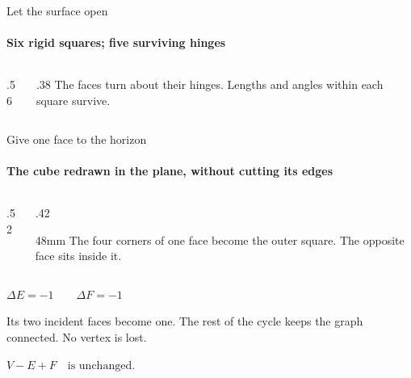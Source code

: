 \documentclass[aspectratio=169,11pt]{beamer}
\begin{document}
\begin{frame}{Let the surface open}
  \framesubtitle{Six rigid squares; five surviving hinges}
  \begin{columns}[c,onlytextwidth]
    \begin{column}{.56\textwidth}
      \centering
    \end{column}
    \begin{column}{.38\textwidth}
      The faces turn about their hinges. Lengths and angles within each
      square survive.\par\medskip
    \end{column}
  \end{columns}
\end{frame}

\begin{frame}{Give one face to the horizon}
  \framesubtitle{The cube redrawn in the plane, without cutting its edges}
  \begin{columns}[c,onlytextwidth]
    \begin{column}{.52\textwidth}
      \centering{}
    \end{column}
    \begin{column}{.42\textwidth}
      \begin{overlayarea}{\linewidth}{48mm}
        The four corners of one face become the outer square. The
        opposite face sits inside it.\par\medskip
      \end{overlayarea}
    \end{column}
  \end{columns}
\end{frame}

{\EulerQuiet
\begin{frame}[plain]
  \centering
  \bigskip
  {\fontsize{34}{40}\selectfont $\Delta E=-1\qquad\Delta F=-1$\par}
  \bigskip
  \begin{minipage}{103mm}\centering
    Its two incident faces become one. The rest of the cycle keeps
    the graph connected. No vertex is lost.
  \end{minipage}\par\bigskip
  {\color{AtlasRubric}\Large $V-E+F\quad\text{is unchanged.}$\par}
\end{frame}}
\end{document}
